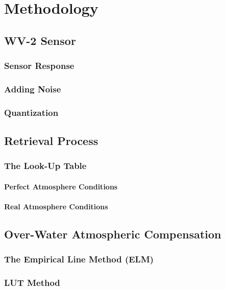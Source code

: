 \chapter{Methodology}
\section{WV-2 Sensor}
\subsection{Sensor Response}
\subsection{Adding Noise}
\subsection{Quantization}

\section{Retrieval Process}
\subsection{The Look-Up Table}

\subsubsection{Perfect Atmosphere Conditions}

\subsubsection{Real Atmosphere Conditions}



\section{Over-Water Atmospheric Compensation}
\subsection{The Empirical Line Method (ELM)}
\subsection{LUT Method}